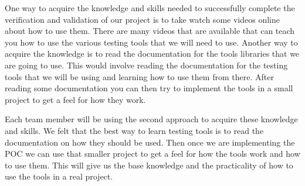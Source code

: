 \documentclass[12pt, titlepage]{article}
\begin{document}
\begin{enumerate}
  One way to acquire the knowledge and skills needed to successfully complete the verification and validation of our project is to take watch some videos online about how to use them.
  There are many videos that are available that can teach you how to use the various testing tools that we will need to use.
  Another way to acquire the knowledge is to read the documentation for the tools libraries that we are going to use.
  This would involve reading the documentation for the testing tools that we will be using and learning how to use them from there.
  After reading some documentation you can then try to implement the tools in a small project to get a feel for how they work.

  Each team member will be using the second approach to acquire these knowledge and skills. 
  We felt that the best way to learn testing tools is to read the documentation on how they should be used.
  Then once we are implementing the POC we can use that smaller project to get a feel for how the tools work and how to use them.
  This will give us the base knowledge and the practicality of how to use the tools in a real project.
\end{enumerate}
\end{document}
